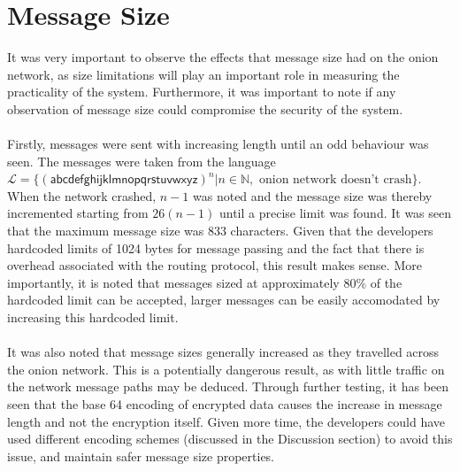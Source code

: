 \documentclass[10pt]{report}
\begin{document}
\section{Message Size}
It was very important to observe the effects that message size had on the onion network, as size
limitations will play an important role in measuring the practicality of the system. Furthermore, it
was important to note if any observation of message size could compromise the security of the
system.\\\\
Firstly, messages were sent with increasing length until an odd behaviour was seen. The messages
were taken from the language $\mathcal{L} = \{(\mathsf{abcdefghijklmnopqrstuvwxyz})^n |
n\in\mathbb{N}, \text{ onion network doesn't crash}\}$. When the network crashed, $n-1$ was noted and
the message size was thereby incremented starting from $26(n-1)$ until a precise limit was found. It
was seen that the maximum message size was 833 characters. Given that the developers hardcoded
limits of 1024 bytes for message passing and the fact that there is overhead associated with the
routing protocol, this result makes sense. More importantly, it is noted that messages sized at
approximately 80\% of the hardcoded limit can be accepted, larger messages can be easily accomodated
by increasing this hardcoded limit.\\\\
It was also noted that message sizes generally increased as they travelled across the onion network.
This is a potentially dangerous result, as with little traffic on the network message paths may be
deduced. Through further testing, it has been seen that the base 64 encoding of encrypted data
causes the increase in message length and not the encryption itself. Given more time, the developers
could have used different encoding schemes (discussed in the Discussion section) to avoid this
issue, and maintain safer message size properties.
\end{document}

